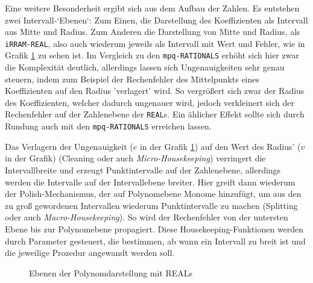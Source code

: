 Eine weitere Besonderheit ergibt sich aus dem Aufbau der Zahlen. Es entstehen zwei Intervall-`Ebenen`: Zum Einen, die Darstellung des Koeffizienten als Intervall aus Mitte und Radius. Zum Anderen die Darstellung von Mitte und Radius, als \verb+iRRAM-REAL+, also auch wiederum jeweils als Intervall mit Wert und Fehler, wie in Grafik \ref{fig:levels} zu sehen ist. Im Vergleich zu den \verb+mpq-RATIONALS+ erhöht sich hier zwar die Komplexität deutlich, allerdings lassen sich Ungenauigkeiten sehr genau steuern, indem zum Beispiel der Rechenfehler des Mittelpunkts eines Koeffizienten auf den Radius 'verlagert' wird. So vergrößert sich zwar der Radius des Koeffizienten, welcher dadurch ungenauer wird, jedoch verkleinert sich der Rechenfehler auf der Zahlenebene der \verb+REAL+s. Ein ählicher Effekt sollte sich durch Rundung auch mit den \verb+mpq-RATIONALS+ erreichen lassen. 


Das Verlagern der Ungenauigkeit ($e$ in der Grafik \ref{fig:levels}) auf den Wert des Radius' ($v$ in der Grafik) (Cleaning oder auch \textit{Micro-Housekeeping}) verringert die Intervallbreite und erzeugt Punktintervalle auf der Zahlenebene, allerdings werden die Intervalle auf der Intervallebene breiter. Hier greift dann wiederum der Polish-Mechanismus, der auf Polynomebene Monome hinzufügt, um aus den zu groß gewordenen Intervallen wiederum Punktintervalle zu machen (Splitting oder auch \textit{Macro-Housekeeping}). So wird der Rechenfehler von der untersten Ebene bis zur Polynomebene propagiert.
Diese Housekeeping-Funktionen werden durch Parameter gesteuert, die bestimmen, ab wann ein Intervall zu breit ist und die jeweilige Prozedur angewandt werden soll.




\begin{figure}[tbh]
\begin{center}
 
   
 \caption{Ebenen der Polynomdarstellung mit REALs}
 \label{fig:levels}
 \end{center}
\end{figure}


